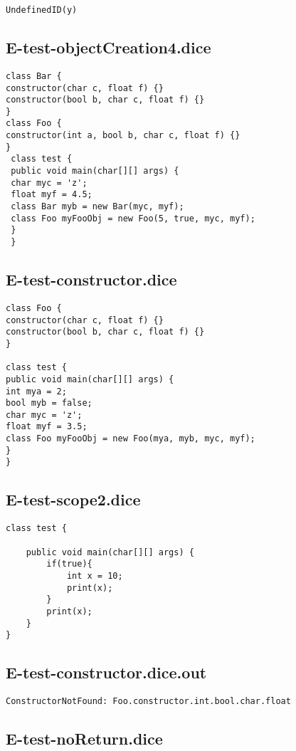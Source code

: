 \begin{verbatim}
UndefinedID(y)

\end{verbatim}\pagebreak\subsection{E-test-objectCreation4.dice}
\begin{verbatim}
class Bar {
constructor(char c, float f) {}
constructor(bool b, char c, float f) {}
}
class Foo {
constructor(int a, bool b, char c, float f) {}
}
 class test {
 public void main(char[][] args) {
 char myc = 'z';
 float myf = 4.5;
 class Bar myb = new Bar(myc, myf);
 class Foo myFooObj = new Foo(5, true, myc, myf);
 }
 }
\end{verbatim}\pagebreak\subsection{E-test-constructor.dice}
\begin{verbatim}
class Foo {
constructor(char c, float f) {}
constructor(bool b, char c, float f) {}
}

class test {
public void main(char[][] args) {
int mya = 2;
bool myb = false;
char myc = 'z';
float myf = 3.5;
class Foo myFooObj = new Foo(mya, myb, myc, myf);
}
}

\end{verbatim}\pagebreak\subsection{E-test-scope2.dice}
\begin{verbatim}
class test {

	public void main(char[][] args) {
		if(true){
			int x = 10;
			print(x);
		}
		print(x);
	}
}
\end{verbatim}\pagebreak\subsection{E-test-constructor.dice.out}
\begin{verbatim}
ConstructorNotFound: Foo.constructor.int.bool.char.float

\end{verbatim}\pagebreak\subsection{E-test-noReturn.dice}
